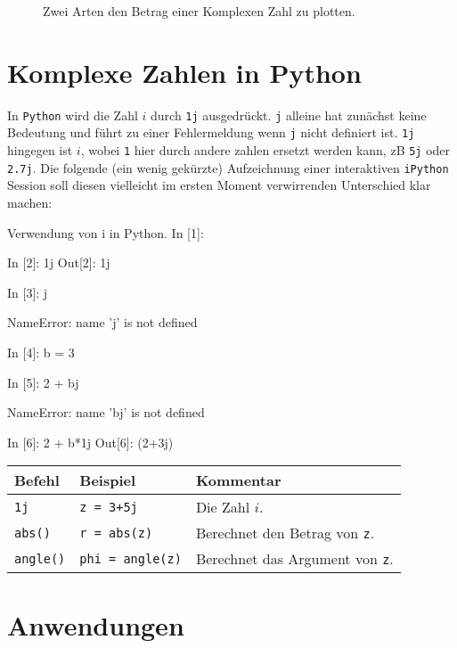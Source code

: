\begin{figure}[h]
	\centering
	
	\caption{Zwei Arten den Betrag einer Komplexen Zahl zu plotten.}
	\label{fig:komp_3D}
\end{figure}


\section{Komplexe Zahlen in Python}

In \texttt{Python} wird die Zahl $i$ durch \texttt{1j} ausgedrückt. \texttt{j} alleine hat zunächst keine Bedeutung und führt zu einer Fehlermeldung wenn \texttt{j} nicht definiert ist. \texttt{1j} hingegen ist $i$, wobei \texttt{1} hier durch andere zahlen ersetzt werden kann, zB \texttt{5j} oder \texttt{2.7j}. Die folgende (ein wenig gekürzte) Aufzeichnung einer interaktiven \texttt{iPython} Session soll diesen vielleicht im ersten Moment verwirrenden Unterschied klar machen:

\begin{python}{Verwendung von i in Python.}
In [1]: %

In [2]: 1j
Out[2]: 1j

In [3]: j

NameError: name 'j' is not defined

In [4]: b = 3

In [5]: 2 + bj

NameError: name 'bj' is not defined

In [6]: 2 + b*1j
Out[6]: (2+3j)
\end{python}



\begin{table}[H]
    \centering
    \begin{tabular}{|p{3cm}|p{6cm}|p{6cm}|}
        \hline
    \textbf{Befehl} & \textbf{Beispiel} & \textbf{Kommentar} \\ \hline
    
    \texttt{1j} & \texttt{z = 3+5j} & Die Zahl $i$. \\ \hline
    \texttt{abs()} & \texttt{r = abs(z)} & Berechnet den Betrag von \texttt{z}. \\ \hline
    \texttt{angle()} & \texttt{phi = angle(z)} & Berechnet das Argument von \texttt{z}. \\ \hline


    \end{tabular}
\end{table}




\section{Anwendungen}\label{sec:anwendungen}

